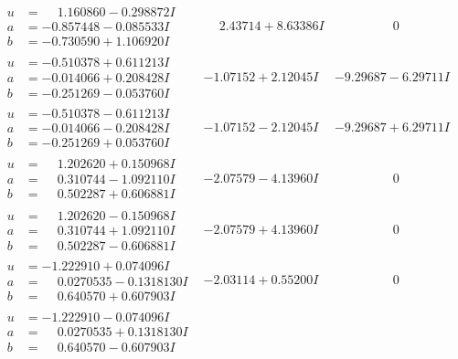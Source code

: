 \documentclass[1p]{elsarticle_modified}
\theoremstyle{definition}
\begin{document}
$$\begin{array}{c|c|c}
\begin{aligned}
u &= \phantom{-}1.160860 - 0.298872 I \\
a &= -0.857448 - 0.085533 I \\
b &= -0.730590 + 1.106920 I\end{aligned}
 & \phantom{-}2.43714 + 8.63386 I & \phantom{-0.000000 } 0 \\ \hline\begin{aligned}
u &= -0.510378 + 0.611213 I \\
a &= -0.014066 + 0.208428 I \\
b &= -0.251269 - 0.053760 I\end{aligned}
 & -1.07152 + 2.12045 I & -9.29687 - 6.29711 I \\ \hline\begin{aligned}
u &= -0.510378 - 0.611213 I \\
a &= -0.014066 - 0.208428 I \\
b &= -0.251269 + 0.053760 I\end{aligned}
 & -1.07152 - 2.12045 I & -9.29687 + 6.29711 I \\ \hline\begin{aligned}
u &= \phantom{-}1.202620 + 0.150968 I \\
a &= \phantom{-}0.310744 - 1.092110 I \\
b &= \phantom{-}0.502287 + 0.606881 I\end{aligned}
 & -2.07579 - 4.13960 I & \phantom{-0.000000 } 0 \\ \hline\begin{aligned}
u &= \phantom{-}1.202620 - 0.150968 I \\
a &= \phantom{-}0.310744 + 1.092110 I \\
b &= \phantom{-}0.502287 - 0.606881 I\end{aligned}
 & -2.07579 + 4.13960 I & \phantom{-0.000000 } 0 \\ \hline\begin{aligned}
u &= -1.222910 + 0.074096 I \\
a &= \phantom{-}0.0270535 - 0.1318130 I \\
b &= \phantom{-}0.640570 + 0.607903 I\end{aligned}
 & -2.03114 + 0.55200 I & \phantom{-0.000000 } 0 \\ \hline\begin{aligned}
u &= -1.222910 - 0.074096 I \\
a &= \phantom{-}0.0270535 + 0.1318130 I \\
b &= \phantom{-}0.640570 - 0.607903 I\end{aligned}

\end{array}$$
\end{document}
